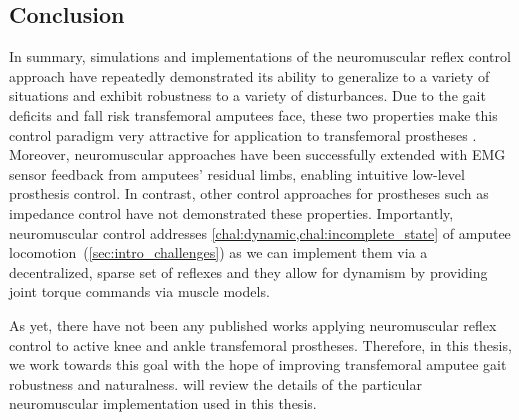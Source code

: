 \subsection{Conclusion} 
In summary, simulations and implementations of the neuromuscular reflex control
approach have repeatedly demonstrated its ability to generalize to a variety of
situations and exhibit robustness to a variety of disturbances. Due to the gait
deficits and fall risk transfemoral amputees face, these two properties make
this control paradigm very attractive for application to transfemoral prostheses
. Moreover, neuromuscular approaches have been successfully extended with EMG
sensor feedback from amputees' residual limbs, enabling intuitive low-level
prosthesis control. In contrast, other control approaches for prostheses such as
impedance control have not demonstrated these properties. Importantly,
neuromuscular control addresses \cref{chal:dynamic,chal:incomplete_state} of amputee
locomotion~(\cref{sec:intro_challenges}) as we can implement them via a
decentralized, sparse set of reflexes and they allow for dynamism by providing
joint torque commands via muscle models.

As yet, there have not been any published works applying neuromuscular reflex
control to active knee and ankle transfemoral prostheses. Therefore, in this
thesis, we work towards this goal with the hope of improving transfemoral
amputee gait robustness and naturalness.  will review the
details of the particular neuromuscular implementation used in this thesis.

